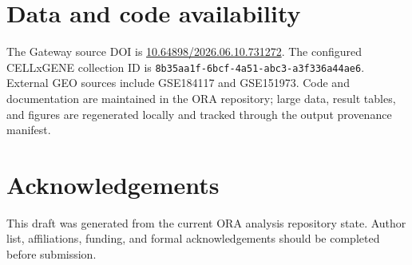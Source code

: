 \documentclass[11pt]{article}
\begin{document}
\section{Data and code availability}

The Gateway source DOI is \href{https://doi.org/10.64898/2026.06.10.731272}{10.64898/2026.06.10.731272}. The configured CELLxGENE collection ID is \texttt{8b35aa1f-6bcf-4a51-abc3-a3f336a44ae6}. External GEO sources include GSE184117 and GSE151973. Code and documentation are maintained in the ORA repository; large data, result tables, and figures are regenerated locally and tracked through the output provenance manifest.

\section{Acknowledgements}

This draft was generated from the current ORA analysis repository state. Author list, affiliations, funding, and formal acknowledgements should be completed before submission.



\end{document}
